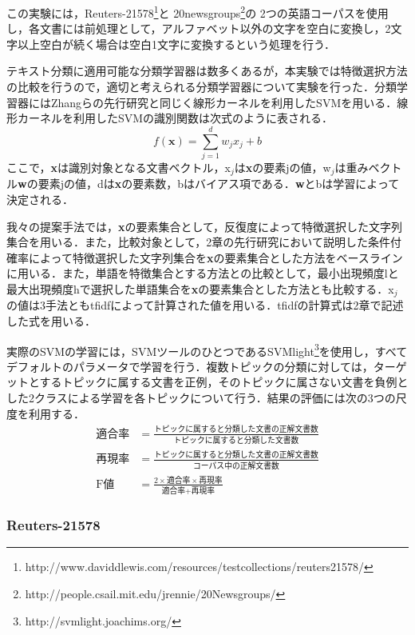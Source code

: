 \documentclass[japanese]{jnlp_1.4}
\begin{document}
この実験には，Reuters-21578\footnote{
	http://www.daviddlewis.com/resources/testcollections/reuters21578/}と
20newsgroups\footnote{
	http://people.csail.mit.edu/jrennie/20Newsgroups/}の
2つの英語コーパスを使用し，各文書には前処理として，アルファベット以外の文字を空白に変換し，2文字以上空白が続く場合は空白1文字に変換するという処理を行う．

テキスト分類に適用可能な分類学習器は数多くあるが，本実験では特徴選択方法の比較を行うので，適切と考えられる分類学習器について実験を行った．分類学習器にはZhangらの先行研究と同じく線形カーネルを利用したSVMを用いる．線形カーネルを利用したSVMの識別関数は次式のように表される．
\[
 f(\mathbf{x})= \sum^{d}_{j=1} w_{j} x_{j} + b
\]
ここで，\textbf{x}は識別対象となる文書ベクトル，x$_{j}$は\textbf{x}の要素jの値，w$_{j}$は重みベクトル\textbf{w}の要素jの値，dは\textbf{x}の要素数，bはバイアス項である．\textbf{w}とbは学習によって決定される．

我々の提案手法では，\textbf{x}の要素集合として，反復度によって特徴選択した文字列集合を用いる．また，比較対象として，2章の先行研究において説明した条件付確率によって特徴選択した文字列集合を\textbf{x}の要素集合とした方法をベースラインに用いる．また，単語を特徴集合とする方法との比較として，最小出現頻度lと最大出現頻度hで選択した単語集合を\textbf{x}の要素集合とした方法とも比較する．x$_{j}$の値は3手法ともtfidfによって計算された値を用いる．tfidfの計算式は2章で記述した式を用いる．

実際のSVMの学習には，SVMツールのひとつであるSVMlight\footnote{ 
http://svmlight.joachims.org/}を使用し，すべてデフォルトのパラメータで学習を行う．複数トピックの分類に対しては，ターゲットとするトピックに属する文書を正例，そのトピックに属さない文書を負例とした2クラスによる学習を各トピックについて行う．結果の評価には次の3つの尺度を利用する．
{\allowdisplaybreaks
\begin{align*}
\text{適合率} & =\frac{\text{トピックに属すると分類した文書の正解文書数}}
	{\text{トピックに属すると分類した文書数}}  \\[1zw]
\text{再現率} & = \frac{\text{トピックに属すると分類した文書の正解文書数}}
	{\text{コーパス中の正解文書数}} \\[1zw]
\text{F値} & = \frac{2 \times \text{適合率} \times \text{再現率}}
	{\text{適合率} + \text{再現率}}
\end{align*}
}


\subsubsection{Reuters-21578}
\end{document}
